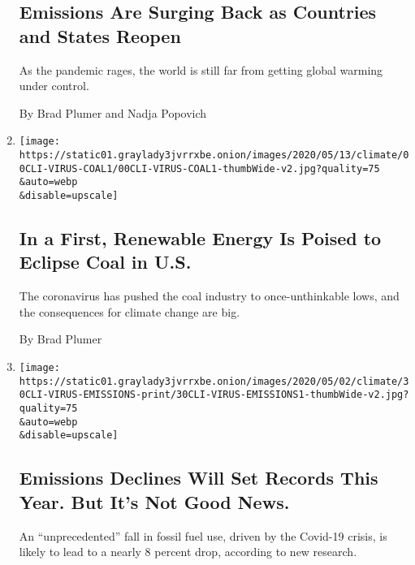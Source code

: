 \begin{enumerate}
  \hypertarget{emissions-are-surging-back-as-countries-and-states-reopen}{%
  \subsection{Emissions Are Surging Back as Countries and States
  Reopen}\label{emissions-are-surging-back-as-countries-and-states-reopen}}

  As the pandemic rages, the world is still far from getting global
  warming under control.

  By Brad Plumer and Nadja Popovich
\item
  \href{/2020/05/13/climate/coronavirus-coal-electricity-renewables.html}{}

  \texttt{[image: https://static01.graylady3jvrrxbe.onion/images/2020/05/13/climate/00CLI-VIRUS-COAL1/00CLI-VIRUS-COAL1-thumbWide-v2.jpg?quality=75\\\&auto=webp\\\&disable=upscale]}

  \hypertarget{in-a-first-renewable-energy-is-poised-to-eclipse-coal-in-us}{%
  \subsection{In a First, Renewable Energy Is Poised to Eclipse Coal in
  U.S.}\label{in-a-first-renewable-energy-is-poised-to-eclipse-coal-in-us}}

  The coronavirus has pushed the coal industry to once-unthinkable lows,
  and the consequences for climate change are big.

  By Brad Plumer
\item
  \href{/2020/04/30/climate/global-emissions-decline.html}{}

  \texttt{[image: https://static01.graylady3jvrrxbe.onion/images/2020/05/02/climate/30CLI-VIRUS-EMISSIONS-print/30CLI-VIRUS-EMISSIONS1-thumbWide-v2.jpg?quality=75\\\&auto=webp\\\&disable=upscale]}

  \hypertarget{emissions-declines-will-set-records-this-year-but-its-not-good-news}{%
  \subsection{Emissions Declines Will Set Records This Year. But It's
  Not Good
  News.}\label{emissions-declines-will-set-records-this-year-but-its-not-good-news}}

  An ``unprecedented'' fall in fossil fuel use, driven by the Covid-19
  crisis, is likely to lead to a nearly 8 percent drop, according to new
  research.


\end{enumerate}
